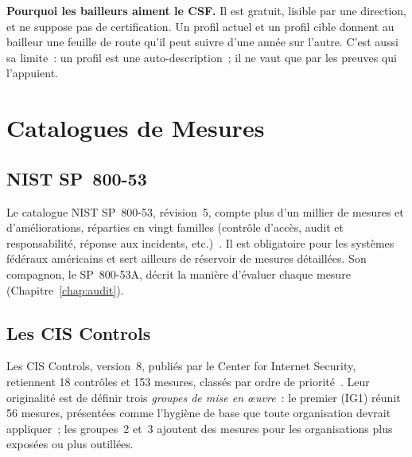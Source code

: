 \begin{boxinfo}
\textbf{Pourquoi les bailleurs aiment le CSF.} Il est gratuit, lisible par
une direction, et ne suppose pas de certification. Un profil actuel et un
profil cible donnent au bailleur une feuille de route qu'il peut suivre
d'une année sur l'autre. C'est aussi sa limite~: un profil est une
auto-description~; il ne vaut que par les preuves qui l'appuient.
\end{boxinfo}

\section{Catalogues de Mesures}
\label{sec:c09-catalogues}

\subsection{NIST SP~800-53}

Le catalogue NIST SP~800-53, révision~5, compte plus d'un millier de
mesures et d'améliorations, réparties en vingt familles (contrôle d'accès,
audit et responsabilité, réponse aux incidents, etc.)~\cite{nist2020sp80053}.
Il est obligatoire pour les systèmes fédéraux américains et sert ailleurs
de réservoir de mesures détaillées. Son compagnon, le SP~800-53A, décrit la
manière d'évaluer chaque mesure (Chapitre~\ref{chap:audit}).

\subsection{Les CIS Controls}

Les CIS Controls, version~8, publiés par le Center for Internet Security,
retiennent 18 contrôles et 153 mesures, classés par ordre de
priorité~\cite{cis2021controls}. Leur originalité est de définir trois
\emph{groupes de mise en œuvre}~: le premier (IG1) réunit 56 mesures,
présentées comme l'hygiène de base que toute organisation devrait appliquer~;
les groupes~2 et~3 ajoutent des mesures pour les organisations plus
exposées ou plus outillées.

